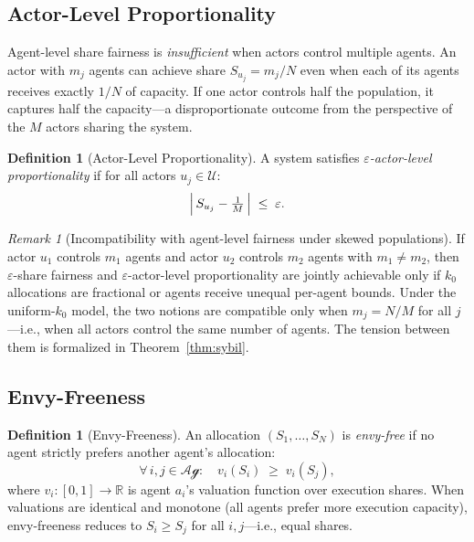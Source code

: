 \documentclass[11pt]{article}
\theoremstyle{plain}
\theoremstyle{definition}
\newtheorem{definition}[theorem]{Definition}
\theoremstyle{remark}
\newtheorem{remark}[theorem]{Remark}
\newcommand{\Agents}{\mathcal{Ag}}         %
\newcommand{\Actors}{\mathcal{U}}          %
\newcommand{\Share}[1]{S_{#1}}             %
\newcommand{\kbound}{k_0}                  %
\begin{document}
\subsection{Actor-Level Proportionality}
\label{sec:actor-fair}

Agent-level share fairness is \emph{insufficient} when actors control
multiple agents.  An actor with $m_j$ agents can achieve share
$\Share{u_j} = m_j/N$ even when each of its agents receives exactly
$1/N$ of capacity.  If one actor controls half the population, it
captures half the capacity---a disproportionate outcome from the
perspective of the $M$ actors sharing the system.

\begin{definition}[Actor-Level Proportionality]
\label{def:actor-fair}
A system satisfies \emph{$\varepsilon$-actor-level proportionality} if
for all actors $u_j \in \Actors$:
\[
  \Bigl|\,\Share{u_j} - \tfrac{1}{M}\,\Bigr| \;\leq\; \varepsilon.
\]
\end{definition}

\begin{remark}[Incompatibility with agent-level fairness under skewed populations]
\label{rem:incompatible}
If actor $u_1$ controls $m_1$ agents and actor $u_2$ controls $m_2$
agents with $m_1 \neq m_2$, then $\varepsilon$-share fairness and
$\varepsilon$-actor-level proportionality are jointly achievable only
if $\kbound$ allocations are fractional or agents receive unequal
per-agent bounds.  Under the uniform-$\kbound$ model, the two notions
are compatible only when $m_j = N/M$ for all $j$---i.e., when all
actors control the same number of agents.  The tension between them
is formalized in Theorem~\ref{thm:sybil}.
\end{remark}

\subsection{Envy-Freeness}
\label{sec:envy}

\begin{definition}[Envy-Freeness]
\label{def:envy}
An allocation $(\Share{1}, \ldots, \Share{N})$ is \emph{envy-free}
if no agent strictly prefers another agent's allocation:
\[
  \forall\, i, j \in \Agents : \quad
  v_i(\Share{i}) \;\geq\; v_i(\Share{j}),
\]
where $v_i : [0,1] \to \mathbb{R}$ is agent $a_i$'s valuation
function over execution shares.  When valuations are identical and
monotone (all agents prefer more execution capacity), envy-freeness
reduces to $\Share{i} \geq \Share{j}$ for all $i, j$---i.e., equal
shares.
\end{definition}
\end{document}
